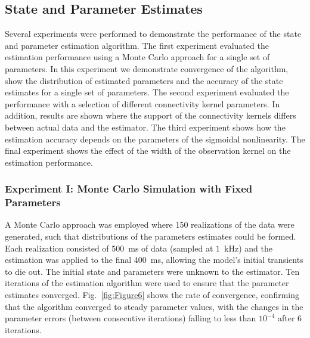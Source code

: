 \documentclass[review,authoryear,3p]{elsarticle}
\begin{document}
\subsection{State and Parameter Estimates} 
\label{sec:state_and_param_results}
Several experiments were performed to demonstrate the performance of the state and parameter estimation algorithm. The first experiment evaluated the estimation performance using a Monte Carlo approach for a single set of parameters. In this experiment we demonstrate convergence of the algorithm, show the distribution of estimated parameters and the accuracy of the state estimates for a single set of parameters. The second experiment evaluated the performance with a selection of different connectivity kernel parameters. In addition, results are shown where the support of the connectivity kernels differs between actual data and the estimator. The third experiment shows how the estimation accuracy depends on the parameters of the sigmoidal nonlinearity. The final experiment shows the effect of the width of the observation kernel on the estimation performance.

\subsubsection{Experiment I: Monte Carlo Simulation with Fixed Parameters}
A Monte Carlo approach was employed where 150 realizations of the data were generated, such that distributions of the parameters estimates could be formed. Each realization consisted of 500~ms of data (sampled at $1$~kHz) and the estimation was applied to the final 400~ms, allowing the model's initial transients to die out. The initial state and parameters were unknown to the estimator. Ten iterations of the estimation algorithm were used to ensure that the parameter estimates converged. Fig.~\ref{fig:Figure6} shows the rate of convergence, confirming that the algorithm converged to steady parameter values, with the changes in the parameter errors (between consecutive iterations) falling to less than $10^{-4}$ after 6 iterations.
\end{document}
